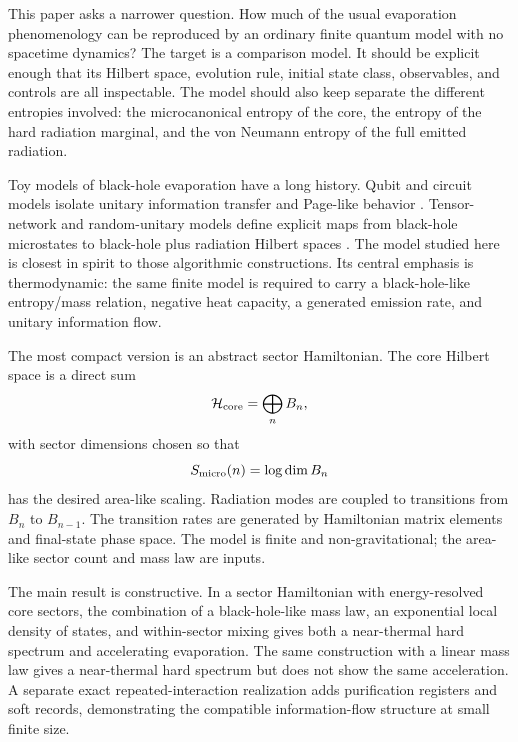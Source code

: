 \documentclass[aps,prd,onecolumn,longbibliography,nofootinbib]{revtex4-2}
\newcommand{\Hcore}{\mathcal{H}_{\rm core}}
\newcommand{\Smicro}{S_{\rm micro}}
\begin{document}
This paper asks a narrower question.  How much of the usual evaporation
phenomenology can be reproduced by an ordinary finite quantum model with no
spacetime dynamics?  The target is a comparison model.  It should be explicit
enough that its Hilbert space, evolution rule, initial state class, observables,
and controls are all inspectable.  The model should also keep separate the
different entropies involved: the microcanonical entropy of the core, the
entropy of the hard radiation marginal, and the von Neumann entropy of the full
emitted radiation.

Toy models of black-hole evaporation have a long history.  Qubit and circuit
models isolate unitary information transfer and Page-like behavior
\cite{Avery2013,OsugaPage2018,Broda2021}.  Tensor-network and random-unitary
models define explicit maps from black-hole microstates to black-hole plus
radiation Hilbert spaces \cite{LeutheusserVanRaamsdonk2017,
PiroliSunderhaufQi2020}.  The model studied here is closest in spirit to those
algorithmic constructions.  Its central emphasis is thermodynamic: the same
finite model is required to carry a black-hole-like entropy/mass relation,
negative heat capacity, a generated emission rate, and unitary information
flow.

The most compact version is an abstract sector Hamiltonian.  The core Hilbert
space is a direct sum
\begin{equation}
    \Hcore=\bigoplus_n B_n ,
\end{equation}
with sector dimensions chosen so that
\begin{equation}
    \Smicro(n)=\log\dim B_n
\end{equation}
has the desired area-like scaling.  Radiation modes are coupled to transitions
from $B_n$ to $B_{n-1}$.  The transition rates are generated by Hamiltonian
matrix elements and final-state phase space.  The model is finite and
non-gravitational; the area-like sector count and mass law are inputs.

The main result is constructive.  In a sector Hamiltonian with
energy-resolved core sectors, the combination of a black-hole-like mass law,
an exponential local density of states, and within-sector mixing gives both a
near-thermal hard spectrum and accelerating evaporation.  The same construction
with a linear mass law gives a near-thermal hard spectrum but does not show the
same acceleration.  A separate exact repeated-interaction realization adds
purification registers and soft records, demonstrating the compatible
information-flow structure at small finite size.
\end{document}
